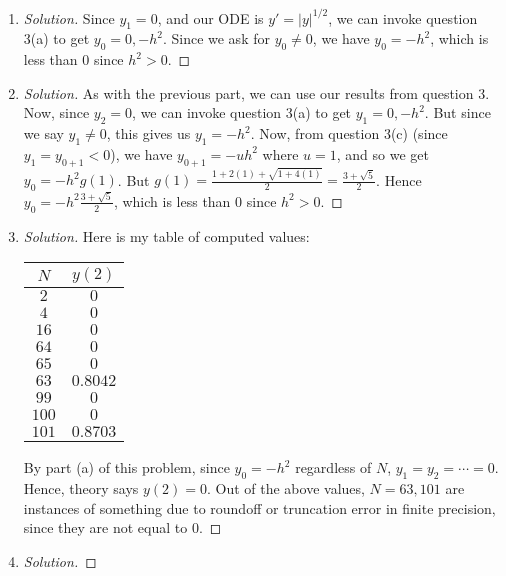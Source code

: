 \documentclass{article}
\begin{document}
\begin{enumerate}
	\item \begin{proof}[Solution]\let\qed\relax
		Since $y_1 = 0$, and our ODE is $y' = |y|^{1/2}$,
		we can invoke question 3(a) to get
		$y_0 = 0, -h^2$.
		Since we ask for $y_0 \neq 0$, we have $y_0 = -h^2$,
		which is less than $0$ since $h^2 > 0$.
	\end{proof}
	\item \begin{proof}[Solution]\let\qed\relax
		As with the previous part, we can use our results from question 3.
		Now, since $y_2 = 0$, we can invoke question 3(a) to get
		$y_1 = 0, -h^2$. But since we say $y_1 \neq 0$,
		this gives us $y_1 = -h^2$.
		Now, from question 3(c) (since $y_1 = y_{0+1} < 0$), we have $y_{0 + 1} = -uh^2$
		where $u = 1$, and so we get $y_0 = -h^2g(1)$.
		But $g(1) = \frac{1+2(1) + \sqrt{1 + 4(1)}}{2} = \frac{3 + \sqrt{5}}{2}$.
		Hence $y_0 = -h^2\frac{3+\sqrt{5}}{2}$,
		which is less than $0$ since $h^2 > 0$.
	\end{proof}
	\item \begin{proof}[Solution]\let\qed\relax
		Here is my table of computed values:
			\begin{center}
				\begin{tabular}{ | c | c | }
					\hline
					$N$ & $y(2)$ \\
					\hline
					$2$ & $0$ \\ 
					$4$ & $0$ \\  
					$16$ & $0$ \\
					$64$ & $0$ \\
					$65$ & $0$ \\
					$63$ & $0.8042$ \\
					$99$ & $0$ \\
					$100$ & $0$ \\
					$101$ & $0.8703$ \\
					\hline
				\end{tabular}
			\end{center}
		By part (a) of this problem, since $y_0 = -h^2$ regardless of $N$,
		$y_1 = y_2 = \cdots = 0$.
		Hence, theory says $y(2) = 0$.
		Out of the above values, $N = 63, 101$ are instances
		of something due to roundoff or truncation error in finite precision,
		since they are not equal to $0$.
	\end{proof}
	\item \begin{proof}[Solution]\let\qed\relax

\end{proof}
\end{enumerate}
\end{document}
